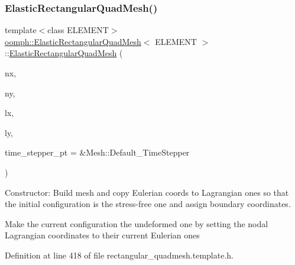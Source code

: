 \subsubsection{\texorpdfstring{Elastic\+Rectangular\+Quad\+Mesh()}{ElasticRectangularQuadMesh()}\hspace{0.1cm}{\footnotesize\ttfamily [2/3]}}
{\footnotesize\ttfamily template$<$class E\+L\+E\+M\+E\+NT$>$ \\
\hyperlink{classoomph_1_1ElasticRectangularQuadMesh}{oomph\+::\+Elastic\+Rectangular\+Quad\+Mesh}$<$ E\+L\+E\+M\+E\+NT $>$\+::\hyperlink{classoomph_1_1ElasticRectangularQuadMesh}{Elastic\+Rectangular\+Quad\+Mesh} (\begin{DoxyParamCaption}\item[{const unsigned \&}]{nx,  }\item[{const unsigned \&}]{ny,  }\item[{const double \&}]{lx,  }\item[{const double \&}]{ly,  }\item[{Time\+Stepper $\ast$}]{time\+\_\+stepper\+\_\+pt = {\ttfamily \&Mesh\+:\+:Default\+\_\+TimeStepper} }\end{DoxyParamCaption})\hspace{0.3cm}{\ttfamily [inline]}}



Constructor\+: Build mesh and copy Eulerian coords to Lagrangian ones so that the initial configuration is the stress-\/free one and assign boundary coordinates. 

Make the current configuration the undeformed one by setting the nodal Lagrangian coordinates to their current Eulerian ones 

Definition at line 418 of file rectangular\+\_\+quadmesh.\+template.\+h.

\mbox{\label{classoomph_1_1ElasticRectangularQuadMesh_a3865acefe6df1aac212d8306f516ebd1}} 
